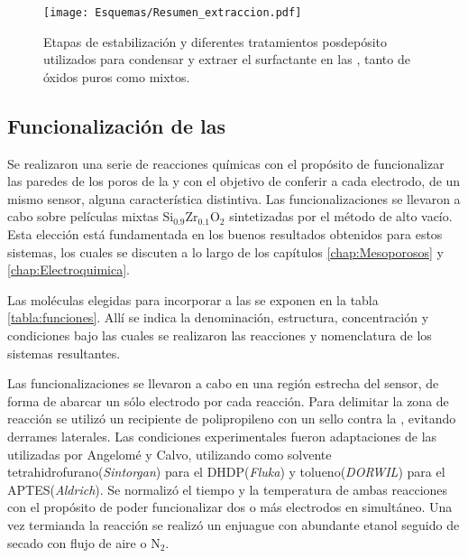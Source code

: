				\begin{figure}[ht!]
						  \begin{center}
						  \texttt{[image: Esquemas/Resumen\_extraccion.pdf]}
						  \caption[Tratamientos pos-depósito de \pdm]{Etapas de estabilización y diferentes tratamientos posdepósito utilizados para condensar y extraer el surfactante en las \pdm, tanto de óxidos puros como mixtos.}
						  \label{esq:peliculas_meso_tratamientos}
						  \end{center}
						  \end{figure}
    	
    	\vspace*{-0.3cm}
	
	\subsection{Funcionalización de las \pdm}\label{sub:funcionalizaci_n_de_las_pdm}
	
		Se realizaron una serie de reacciones químicas con el propósito de funcionalizar las paredes de los poros de la \pdm\space y con el objetivo de conferir a cada electrodo, de un mismo sensor, alguna característica distintiva. Las funcionalizaciones se llevaron a cabo sobre películas mixtas Si$_{0.9}$Zr$_{0.1}$O$_2$ sintetizadas por el método de alto vacío. Esta elección está fundamentada en los buenos resultados obtenidos para estos sistemas, los cuales se discuten a lo largo de los capítulos \ref{chap:Mesoporosos} y \ref{chap:Electroquimica}.

		Las moléculas elegidas para incorporar a las \pdmZ\space se exponen en la tabla \ref{tabla:funciones}. Allí se indica la denominación, estructura, concentración y condiciones bajo las cuales se realizaron las reacciones y nomenclatura de los sistemas resultantes.

		Las funcionalizaciones se llevaron a cabo en una región estrecha del sensor, de forma de abarcar un sólo electrodo por cada reacción. Para delimitar la zona de reacción se utilizó un recipiente de polipropileno con un sello contra la \pdm, evitando derrames laterales. Las condiciones experimentales fueron adaptaciones de las utilizadas por Angelomé\cite{Angelome2008} y Calvo\cite{Calvo20210}, utilizando como solvente tetrahidrofurano(\textit{Sintorgan}) para el DHDP(\textit{Fluka}) y tolueno(\textit{DORWIL}) para el APTES(\textit{Aldrich}). Se normalizó el tiempo y la temperatura de ambas reacciones con el propósito de poder funcionalizar dos o más electrodos en simultáneo. Una vez termianda la reacción se realizó un enjuague con abundante etanol seguido de secado con flujo de aire o N$_2$.

